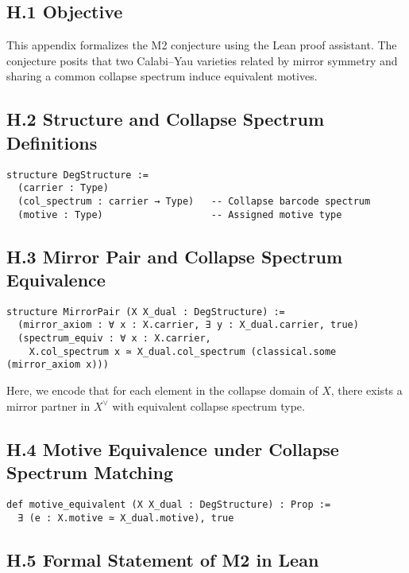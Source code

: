 \documentclass[11pt]{article}
\begin{document}
\subsection*{H.1 Objective}

This appendix formalizes the M2 conjecture using the Lean proof assistant. The conjecture posits that two Calabi–Yau varieties related by mirror symmetry and sharing a common collapse spectrum induce equivalent motives.

\subsection*{H.2 Structure and Collapse Spectrum Definitions}

\begin{lstlisting}[language=Lean]
structure DegStructure :=
  (carrier : Type)
  (col_spectrum : carrier → Type)   -- Collapse barcode spectrum
  (motive : Type)                   -- Assigned motive type
\end{lstlisting}

\subsection*{H.3 Mirror Pair and Collapse Spectrum Equivalence}

\begin{lstlisting}[language=Lean]
structure MirrorPair (X X_dual : DegStructure) :=
  (mirror_axiom : ∀ x : X.carrier, ∃ y : X_dual.carrier, true)
  (spectrum_equiv : ∀ x : X.carrier, 
    X.col_spectrum x ≃ X_dual.col_spectrum (classical.some (mirror_axiom x)))
\end{lstlisting}

Here, we encode that for each element in the collapse domain of $X$, there exists a mirror partner in $X^\vee$ with equivalent collapse spectrum type.

\subsection*{H.4 Motive Equivalence under Collapse Spectrum Matching}

\begin{lstlisting}[language=Lean]
def motive_equivalent (X X_dual : DegStructure) : Prop :=
  ∃ (e : X.motive ≃ X_dual.motive), true
\end{lstlisting}

\subsection*{H.5 Formal Statement of M2 in Lean}
\end{document}
